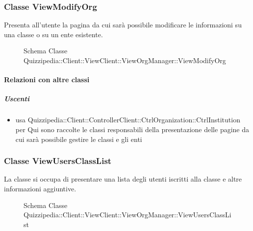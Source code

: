 \subsubsection{Classe ViewModifyOrg}
Presenta all'utente la pagina da cui sarà possibile modificare le informazioni su una classe o su un ente esistente.
\begin{figure}[H]
\centering
\noindent{}
\caption[Schema Classe ViewModifyOrg]{Schema Classe Quizzipedia::Client::ViewClient::ViewOrgManager::ViewModifyOrg}
\end{figure}
\paragraph{Relazioni con altre classi}
\subparagraph{Uscenti}
\begin{itemize}
\item usa Quizzipedia::Client::ControllerClient::CtrlOrganization::CtrlInstitution per Qui sono raccolte le classi responsabili della presentazione delle pagine da cui sarà possibile gestire le classi e gli enti
\end{itemize}
\subsubsection{Classe ViewUsersClassList}
La classe si occupa di presentare una lista degli utenti iscritti alla classe e altre informazioni aggiuntive.
\begin{figure}[H]
\centering
\noindent{}
\caption[Schema Classe ViewUsersClassList]{Schema Classe Quizzipedia::Client::ViewClient::ViewOrgManager::ViewUsersClassList}
\end{figure}

